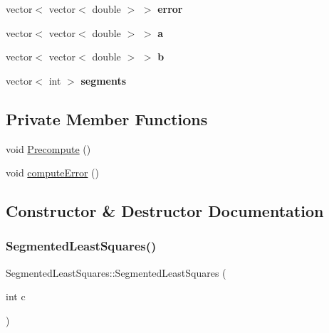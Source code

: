 \begin{DoxyCompactItemize}
vector$<$ vector$<$ double $>$ $>$ {\bfseries error}
\item 
\mbox{\label{classSegmentedLeastSquares_a6f777c0cd5d64a355ce9b5b56c265152}} 
vector$<$ vector$<$ double $>$ $>$ {\bfseries a}
\item 
\mbox{\label{classSegmentedLeastSquares_aa3ce9b084abe09508a2ac6d8bfc03cfa}} 
vector$<$ vector$<$ double $>$ $>$ {\bfseries b}
\item 
\mbox{\label{classSegmentedLeastSquares_a7909b3938fe2f040c7b295092a8fe0ff}} 
vector$<$ int $>$ {\bfseries segments}
\end{DoxyCompactItemize}
\subsection*{Private Member Functions}
\begin{DoxyCompactItemize}
\item 
void \hyperlink{classSegmentedLeastSquares_a3e716cac8bd4276cf7c1a382a40cb283}{Precompute} ()
\item 
void \hyperlink{classSegmentedLeastSquares_afeded48faee42484d3b5b82dd166121d}{compute\+Error} ()
\end{DoxyCompactItemize}


\subsection{Constructor \& Destructor Documentation}
\mbox{\label{classSegmentedLeastSquares_a70bd60ec9de1d4f4c17d10b98d3a4d12}} 
\subsubsection{\texorpdfstring{Segmented\+Least\+Squares()}{SegmentedLeastSquares()}}
{\footnotesize\ttfamily Segmented\+Least\+Squares\+::\+Segmented\+Least\+Squares (\begin{DoxyParamCaption}\item[{int}]{c }\end{DoxyParamCaption})}

